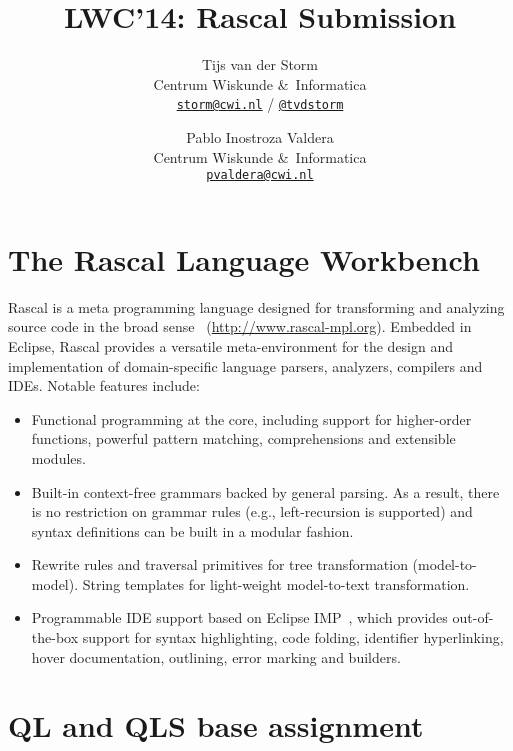 \documentclass[a4paper]{article}
\begin{document}
\title{LWC'14: Rascal Submission}
\author{Tijs van der Storm \\
Centrum Wiskunde \&\ Informatica \\
\href{mailto:storm@cwi.nl}{\texttt{storm@cwi.nl}} / \href{http://twitter.com/tvdstorm}{\texttt{@tvdstorm}}
\and Pablo Inostroza Valdera\\ 
Centrum Wiskunde \&\ Informatica \\
\href{mailto:pvaldera@cwi.nl}{\texttt{pvaldera@cwi.nl}}
}
\maketitle

\section{The Rascal Language Workbench}

Rascal is a meta programming language designed for transforming and
analyzing source code in the broad sense~\cite{KlintSV09}
(\url{http://www.rascal-mpl.org}). Embedded in Eclipse, Rascal
provides a versatile meta-environment for the design and
implementation of domain-specific language parsers, analyzers,
compilers and IDEs. Notable features include:
\begin{itemize}
\item Functional programming at the core, including support for
  higher-order functions, powerful pattern matching,
  comprehensions and extensible modules.
\item Built-in context-free grammars backed by general parsing. As a
  result, there is no restriction on grammar rules (e.g.,
  left-recursion is supported) and syntax definitions can be built in
  a modular fashion.
\item Rewrite rules and traversal primitives for tree transformation
  (model-to-model). String templates for light-weight model-to-text
  transformation.
\item Programmable IDE support based on Eclipse
  IMP~\cite{CharlesFSDV09}, which provides out-of-the-box support for
  syntax highlighting, code folding, identifier hyperlinking, hover
  documentation, outlining, error marking and builders. 
\end{itemize}


\section{QL and QLS base assignment}
\end{document}
